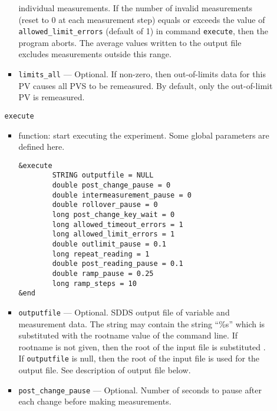 \begin{itemize}
\begin{itemize}
\begin{itemize}
                individual measurements. If the number of invalid measurements (reset to 0 at each
                measurement step) equals or exceeds the value
                of {\verb+allowed_limit_errors+} (default of 1) in command {\verb+execute+}, then the program aborts.
                The average values written to the output file excludes measurements outside this range.
        \item {\verb+limits_all+} --- Optional. If non-zero, then out-of-limits data for this PV causes 
                all PVS to be remeasured. By default, only the out-of-limit PV is remeasured.
\end{itemize}

\begin{latexonly}
\newpage\begin{center}{\Large \verb+execute+}\end{center}
\end{latexonly}
\begin{htmlonly}
\item {\Large \verb+execute+}
\end{htmlonly}
\begin{itemize}
        \item function: start executing the experiment. Some global parameters are defined here.
\begin{verbatim}
&execute
        STRING outputfile = NULL
        double post_change_pause = 0
        double intermeasurement_pause = 0
        double rollover_pause = 0
        long post_change_key_wait = 0
        long allowed_timeout_errors = 1
        long allowed_limit_errors = 1
        double outlimit_pause = 0.1
        long repeat_reading = 1
        double post_reading_pause = 0.1
        double ramp_pause = 0.25
        long ramp_steps = 10
&end
\end{verbatim}
        \item {\verb+outputfile+} --- Optional. SDDS output file of variable and measurement data. The string
                may contain the string ``\%s'' which is substituted with the rootname value
                of the command line. If rootname is not given, then the root of the input file
                is substituted . If {\verb+outputfile+} is null, then the root of the input file
                is used for the output file. See description of output file below.
        \item {\verb+post_change_pause+} ---  Optional. Number of seconds to pause after each change before
                making measurements.

\end{itemize}
\end{itemize}
\end{itemize}
